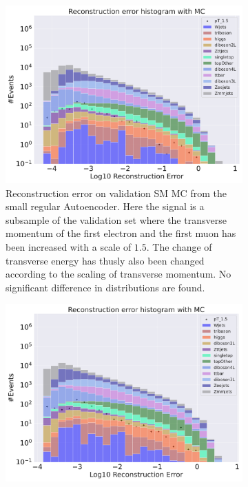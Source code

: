 \begin{figure}[h!]
    \centering
    \begin{subfigure}{.45\textwidth}
        \includegraphics[width=\textwidth]{Figures/AE_testing/small/b_data_recon_big_rm3_feats_sig_pT_1.5.pdf}
        \caption{Reconstruction error on validation SM MC from the small regular Autoencoder. Here the signal is a subsample of the validation 
        set where the transverse momentum of the first electron and the first muon has been increased with a scale of $1.5$. The change of transverse 
        energy has thusly also been changed according to the scaling of transverse momentum. No significant difference in distributions are found. }
        \label{fig:ae_small_pt_1_5}
    \end{subfigure}
    \hfill 
    \begin{subfigure}{.45\textwidth}
        \includegraphics[width=\textwidth]{Figures/AE_testing/big/b_data_recon_big_rm3_feats_sig_pT_1.5.pdf}

\end{subfigure}
\end{figure}
